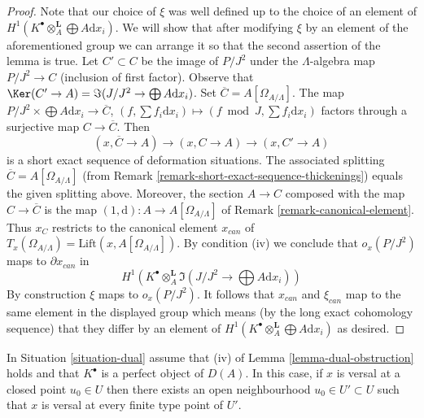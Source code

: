 \begin{proof}
\medskip\noindent
Note that our choice of $\xi$ was well defined up to the choice of an
element of $H^1(K^\bullet \otimes_A^\mathbf{L} \bigoplus A\text{d}x_i)$.
We will show that after modifying $\xi$ by an element of the aforementioned
group we can arrange it so that the second assertion of the lemma is true.
Let $C' \subset C$ be the image of $P/J^2$ under the
$\Lambda$-algebra map $P/J^2 \to C$ (inclusion of first factor).
Observe that
$\Ker(C' \to A) = \Im(J/J^2 \to \bigoplus A\text{d}x_i)$.
Set $\overline{C} = A[\Omega_{A/\Lambda}]$. The map
$P/J^2 \times \bigoplus A \text{d}x_i \to \overline{C}$,
$(f, \sum f_i \text{d}x_i) \mapsto (f \bmod J, \sum f_i \text{d}x_i)$
factors through a surjective map $C \to \overline{C}$. Then
$$
(x, \overline{C} \to A) \to (x, C \to A) \to (x, C' \to A)
$$
is a short exact sequence of deformation situations. The
associated splitting $\overline{C} = A[\Omega_{A/\Lambda}]$ (from
Remark \ref{remark-short-exact-sequence-thickenings}) equals the given
splitting above. Moreover, the section $A \to C$ composed with the map
$C \to \overline{C}$
is the map $(1, \text{d}) : A \to A[\Omega_{A/\Lambda}]$ of
Remark \ref{remark-canonical-element}.
Thus $x_C$ restricts to the canonical element $x_{can}$ of
$T_x(\Omega_{A/\Lambda}) = \text{Lift}(x, A[\Omega_{A/\Lambda}])$.
By condition (iv) we conclude that $o_x(P/J^2)$ maps to $\partial x_{can}$
in
$$
H^1(K^\bullet \otimes_A^\mathbf{L} \Im(J/J^2 \to \bigoplus A\text{d}x_i))
$$
By construction $\xi$ maps to $o_x(P/J^2)$. It follows that
$x_{can}$ and $\xi_{can}$ map to the same element in the
displayed group which means (by the long exact cohomology sequence)
that they differ by an element of
$H^1(K^\bullet \otimes_A^\mathbf{L} \bigoplus A\text{d}x_i)$
as desired.
\end{proof}

\begin{lemma}
\label{lemma-dual-openness}
In Situation \ref{situation-dual} assume that (iv) of
Lemma \ref{lemma-dual-obstruction} holds and that $K^\bullet$ is a
perfect object of $D(A)$. In this case, if $x$ is versal at a closed
point $u_0 \in U$ then there exists an open neighbourhood
$u_0 \in U' \subset U$ such that $x$ is versal at every finite type
point of $U'$.
\end{lemma}

